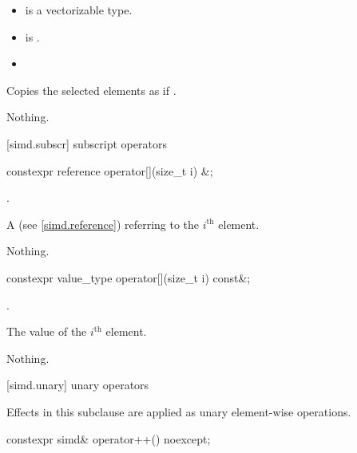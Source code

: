 \begin{itemdescr}
  \pnum\constraints
  \begin{itemize}
    \item {} is a vectorizable type.
    \item {} is .
  \end{itemize}

  \pnum\requires
  \begin{itemize}
    \item \validMaskedRange
  \end{itemize}

  \pnum\effects
  Copies the selected elements as if  \forallmaskedi.

  \pnum\throws Nothing.
\end{itemdescr}

[simd.subscr]{ subscript operators}

\begin{itemdecl}
constexpr reference operator[](size_t i) &;
\end{itemdecl}

\begin{itemdescr}
  \pnum\requires
  .

  \pnum\returns
  A  (see \ref{simd.reference}) referring to the $i^\text{th}$ element.

  \pnum\throws Nothing.
\end{itemdescr}

\begin{itemdecl}
constexpr value_type operator[](size_t i) const&;
\end{itemdecl}

\begin{itemdescr}
  \pnum\requires
  .

  \pnum\returns
  The value of the $i^\text{th}$ element.

  \pnum\throws Nothing.
\end{itemdescr}

[simd.unary]{ unary operators}

\pnum
Effects in this subclause are applied as unary element-wise operations.

\begin{itemdecl}
constexpr simd& operator++() noexcept;
\end{itemdecl}

